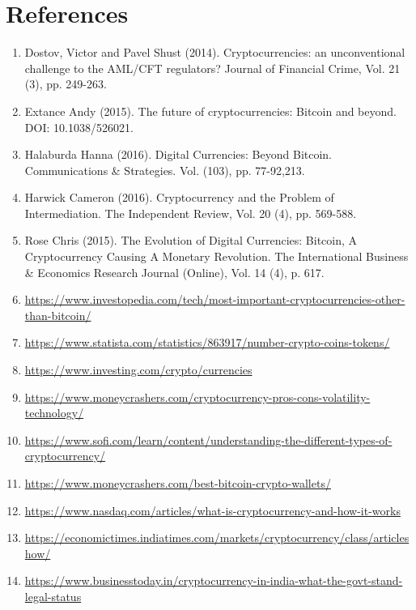\documentclass[11pt]{article}
\begin{document}
\section*{References}
\begin{enumerate}
    \item Dostov, Victor and Pavel Shust (2014). Cryptocurrencies: an unconventional challenge to the AML/CFT regulators? Journal of Financial Crime, Vol. 21 (3), pp. 249-263.
    \item Extance Andy (2015). The future of cryptocurrencies: Bitcoin and beyond. DOI: 10.1038/526021.
    \item Halaburda Hanna (2016). Digital Currencies: Beyond Bitcoin. Communications \& Strategies. Vol. (103), pp. 77-92,213.
    \item Harwick Cameron (2016). Cryptocurrency and the Problem of Intermediation. The Independent Review, Vol. 20 (4), pp. 569-588.
    \item Rose Chris (2015). The Evolution of Digital Currencies: Bitcoin, A Cryptocurrency Causing A Monetary Revolution. The International Business \& Economics Research Journal (Online), Vol. 14 (4), p. 617.
    \item \url{https://www.investopedia.com/tech/most-important-cryptocurrencies-other-than-bitcoin/}
    \item \url{https://www.statista.com/statistics/863917/number-crypto-coins-tokens/}
    \item \url{https://www.investing.com/crypto/currencies}
    \item \url{https://www.moneycrashers.com/cryptocurrency-pros-cons-volatility-technology/}
    \item \url{https://www.sofi.com/learn/content/understanding-the-different-types-of-cryptocurrency/}
    \item \url{https://www.moneycrashers.com/best-bitcoin-crypto-wallets/}
    \item \url{https://www.nasdaq.com/articles/what-is-cryptocurrency-and-how-it-works}
    \item \url{https://economictimes.indiatimes.com/markets/cryptocurrency/class/articleshow/}
    \item \url{https://www.businesstoday.in/cryptocurrency-in-india-what-the-govt-stand-legal-status}
\end{enumerate}
\end{document}
